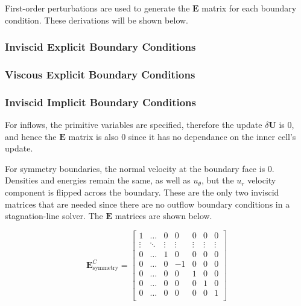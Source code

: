 \documentclass[10pt]{article}
\begin{document}
\begin{flushleft}
First-order perturbations are used to generate the $\boldsymbol{E}$ matrix for each boundary condition. These derivations will be shown below.


\subsubsection{Inviscid Explicit Boundary Conditions}

\subsubsection{Viscous Explicit Boundary Conditions}

\subsubsection{Inviscid Implicit Boundary Conditions}

For inflows, the primitive variables are specified, therefore the update $\delta \boldsymbol{U}$ is 0, and hence the $\boldsymbol{E}$ matrix is also 0 since it has no dependance on the inner cell's update.

\vspace{5mm}

For symmetry boundaries, the normal velocity at the boundary face is 0. Densities and energies remain the same, as well as $u_\theta$, but the $u_r$ velocity component is flipped across the boundary. These are the only two inviscid matrices that are needed since there are no outflow boundary conditions in a stagnation-line solver. The $\boldsymbol{E}$ matrices are shown below.

\begin{equation*}
    \boldsymbol{E}_\text{symmetry}^C = \begin{bmatrix}
        1 & \dots & 0 & 0 & 0 & 0 & 0 \\
        \vdots & \ddots & \vdots & \vdots & \vdots & \vdots & \vdots \\
        0 & \dots & 1 & 0 & 0 & 0 & 0 \\
        0 & \dots & 0 & -1 & 0 & 0 & 0 \\
        0 & \dots & 0 & 0 & 1 & 0 & 0 \\
        0 & \dots & 0 & 0 & 0 & 1 & 0 \\
        0 & \dots & 0 & 0 & 0 & 0 & 1 \\
    \end{bmatrix}
\end{equation*}


\end{flushleft}
\end{document}
